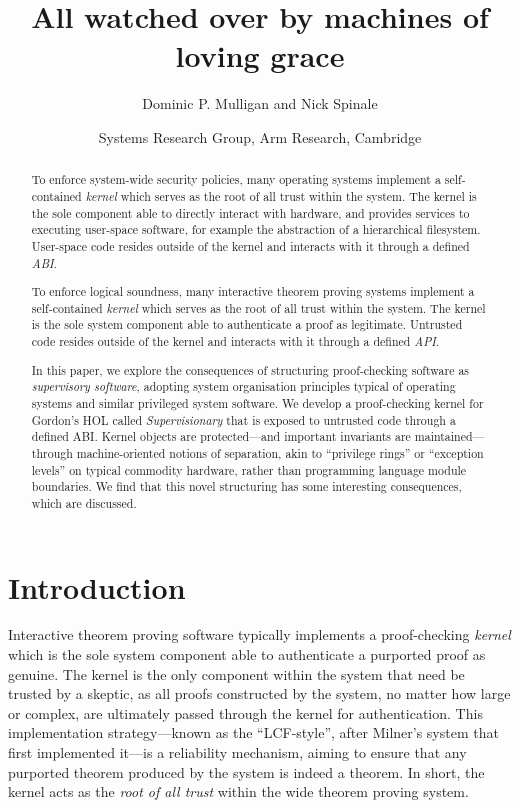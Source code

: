 \documentclass[a4paper, 10pt]{article}
\title{All watched over by machines of loving grace}
\author{Dominic P. Mulligan and Nick Spinale}
\date{Systems Research Group, Arm Research, Cambridge}
\begin{document}
\maketitle

\begin{abstract}
To enforce system-wide security policies, many operating systems implement a self-contained \emph{kernel} which serves as the root of all trust within the system.
The kernel is the sole component able to directly interact with hardware, and provides services to executing user-space software, for example the abstraction of a hierarchical filesystem.
User-space code resides outside of the kernel and interacts with it through a defined \emph{ABI}.

To enforce logical soundness, many interactive theorem proving systems implement a self-contained \emph{kernel} which serves as the root of all trust within the system.
The kernel is the sole system component able to authenticate a proof as legitimate.
Untrusted code resides outside of the kernel and interacts with it through a defined \emph{API}.

In this paper, we explore the consequences of structuring proof-checking software as \emph{supervisory software}, adopting system organisation principles typical of operating systems and similar privileged system software.
We develop a proof-checking kernel for Gordon's HOL called \emph{Supervisionary} that is exposed to untrusted code through a defined ABI.
Kernel objects are protected---and important invariants are maintained---through machine-oriented notions of separation, akin to ``privilege rings'' or ``exception levels'' on typical commodity hardware, rather than programming language module boundaries.
We find that this novel structuring has some interesting consequences, which are discussed.
\end{abstract}

\section{Introduction}
\label{sect.introduction}

Interactive theorem proving software typically implements a proof-checking \emph{kernel} which is the sole system component able to authenticate a purported proof as genuine.
The kernel is the only component within the system that need be trusted by a skeptic, as all proofs constructed by the system, no matter how large or complex, are ultimately passed through the kernel for authentication.
This implementation strategy---known as the ``LCF-style'', after Milner's system that first implemented it---is a reliability mechanism, aiming to ensure that any purported theorem produced by the system is indeed a theorem.
In short, the kernel acts as the \emph{root of all trust} within the wide theorem proving system.
\end{document}
